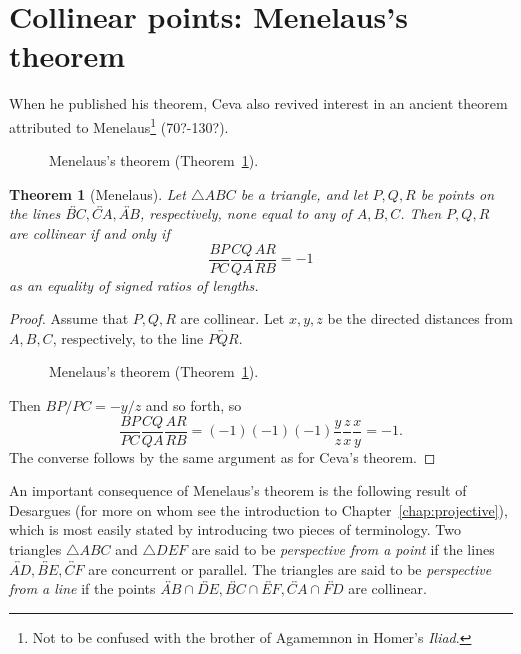 \documentclass[12pt]{book}
\numberwithin{exc}{section}
\numberwithin{figure}{section}
\newtheorem{theorem}{Theorem}[section]
\numberwithin{equation}{theorem}
\def\line#1{\overleftrightarrow{#1}}
\begin{document}
\section{Collinear points: Menelaus's theorem}

When he published his theorem, Ceva 
also revived interest in an ancient 
theorem attributed to Menelaus\footnote{Not to be confused with
the brother of Agamemnon  in 
 Homer's \textit{Iliad}.} 
 (70?-130?).
\begin{figure}[ht]
\caption{Menelaus's theorem (Theorem~\ref{thm:menelaus}).}
\end{figure}

\begin{theorem}[Menelaus] \label{thm:menelaus}
Let $\triangle
ABC$ be a triangle, and let $P, Q, R$ be points on the lines $\line{BC}, 
\line{CA}, \line{AB}$, respectively, none equal to any of $A,B,C$. 
Then $P, Q, R$ are collinear if and only if
\[
\frac{BP}{PC} \frac{CQ}{QA} \frac{AR}{RB} = -1
\]
as an equality of signed ratios of lengths.
\end{theorem}
\begin{proof}
Assume that $P,Q,R$ are collinear.
Let $x,y,z$ be the directed distances from $A,B,C$, 
respectively, to the line $\line{PQR}$. 
\begin{figure}[ht]
\caption{Menelaus's theorem (Theorem~\ref{thm:menelaus}).}
\end{figure}
Then $BP/PC = -y/z$ and so forth, so
\[
\frac{BP}{PC} \frac{CQ}{QA} \frac{AR}{RB} = (-1)(-1)(-1) \frac{y}{z} 
\frac{z}{x} \frac{x}{y} = -1.
\]
The converse follows by the same argument as for Ceva's theorem.
\end{proof}

An important consequence of Menelaus's theorem is the following result 
of Desargues  (for more on whom see
the introduction to Chapter~\ref{chap:projective}), 
which is most easily stated by introducing two pieces of 
terminology. Two triangles $\triangle 
ABC$ and $\triangle DEF$ are said to be 
\emph{perspective from a point} 
if the lines $\line{AD}, \line{BE}, 
\line{CF}$ are 
concurrent or parallel. 
The triangles are said to be \emph{perspective from a line}
if the 
points $\line{AB} \cap \line{DE}, \line{BC} \cap 
\line{EF}, \line{CA} \cap \line{FD}$ are collinear.
\end{document}
